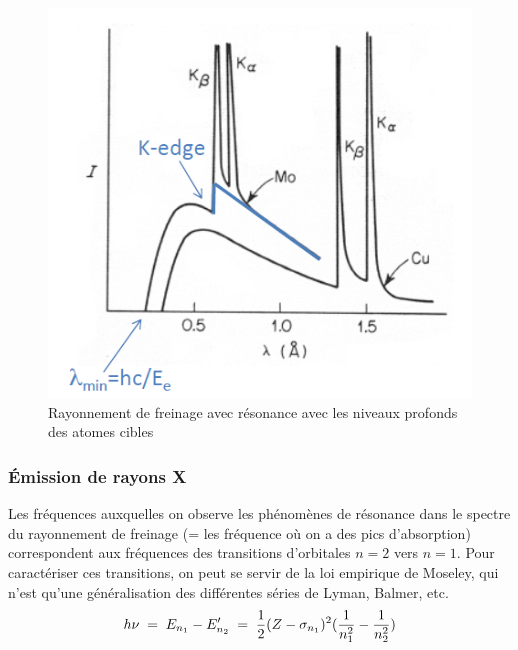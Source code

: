 \begin{figure}[tph]
    \centering
    \includegraphics[scale=1.0]{Images2/RayonnementFreinage.PNG}
    \caption{Rayonnement de freinage avec résonance avec les niveaux profonds des atomes cibles}
    \label{fig:Rayonnement freinage}
\end{figure}


\subsubsection{Émission de rayons X}


Les fréquences auxquelles on observe les phénomènes de résonance dans le spectre du rayonnement de freinage (= les fréquence où on a des pics d'absorption) correspondent aux fréquences des transitions d'orbitales $n = 2$ vers $n = 1$. Pour caractériser ces transitions, on peut se servir de la loi empirique de Moseley, qui n'est qu'une généralisation des différentes séries de Lyman, Balmer, etc. %
\begin{equation}
    h\nu 
    \; = \; E_{n_1} - E'_{n_2}
    \; = \; \dfrac{1}{2}(Z-\sigma_{n_1})^2(\dfrac{1}{n_1^2}-\dfrac{1}{n_2^2})
    \label{eq:Moseley}
\end{equation}


